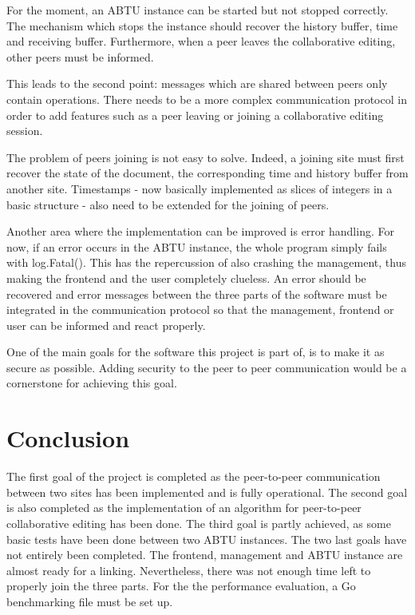 \documentclass[11pt, a4paper, oneside, openright]{article} %
\begin{document}
For the moment, an ABTU instance can be started but not stopped correctly. The mechanism which stops the instance should recover the history buffer, time and receiving buffer. Furthermore, when a peer leaves the collaborative editing, other peers must be informed.

This leads to the second point: messages which are shared between peers only contain operations. There needs to be a more complex communication protocol in order to add features such as a peer leaving or joining a collaborative editing session.

The problem of peers joining is not easy to solve. Indeed, a joining site must first recover the state of the document, the corresponding time and history buffer from another site. Timestamps -  now basically implemented as slices of integers in a basic structure - also need to be extended for the joining of peers.

Another area where the implementation can be improved is error handling. For now, if an error occurs in the ABTU instance, the whole program simply fails with log.Fatal(). This has the repercussion of also crashing the management, thus making the frontend and the user completely clueless. An error should be recovered and error messages between the three parts of the software must be integrated in the communication protocol so that the management, frontend or user can be informed and react properly.

One of the main goals for the software this project is part of, is to make it as secure as possible. Adding security to the peer to peer communication would be a cornerstone for achieving this goal.

\section{Conclusion}

The first goal of the project is completed as the peer-to-peer communication between two sites has been implemented and is fully operational. The second goal is also completed as the implementation of an algorithm for peer-to-peer collaborative editing has been done. The third goal is partly achieved, as some basic tests have been done between two ABTU instances. The two last goals have not entirely been completed. The frontend, management and ABTU instance are almost ready for a linking. Nevertheless, there was not enough time left to properly join the three parts. For the the performance evaluation, a Go benchmarking file must be set up.
\end{document}
